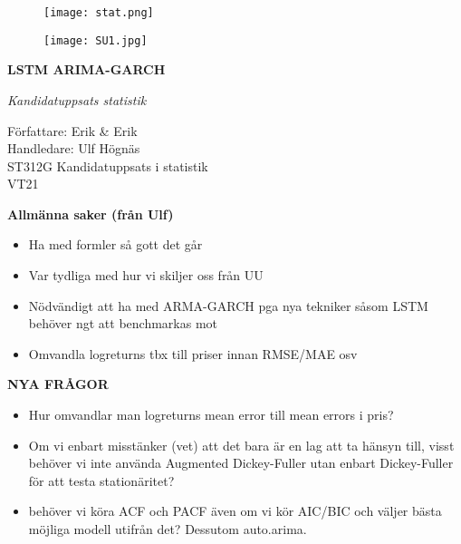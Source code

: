 \documentclass[12pt]{article}
\begin{document}
\begin{titlepage}
\thispagestyle{empty}
	\begin{figure}[ht]
			\texttt{[image: stat.png]}
			
	   \endminipage
		 \texttt{[image: SU1.jpg]}
			
\endminipage
\end{figure}
	
	
\centering
\vspace{5cm}

{\large\bfseries LSTM ARIMA-GARCH\par}
	\vspace{0.5cm}
	
{\large\itshape Kandidatuppsats statistik \par}
	\vfill
	
\begin{flushleft}
Författare: Erik \& Erik \\
Handledare: Ulf Högnäs\\
ST312G Kandidatuppsats i statistik \\
VT21
\end{flushleft}
\end{titlepage}

\newpage
\tableofcontents
\newpage

\textbf{Allmänna saker (från Ulf)}
\begin{itemize}
    \item Ha med formler så gott det går
    \item Var tydliga med hur vi skiljer oss från UU
    \item Nödvändigt att ha med ARMA-GARCH pga nya tekniker såsom LSTM behöver ngt att benchmarkas mot
    \item Omvandla logreturns tbx till priser innan RMSE/MAE osv
\end{itemize}

\textbf{NYA FRÅGOR}
\begin{itemize}
    \item Hur omvandlar man logreturns mean error till mean errors i pris?
    \item Om vi enbart misstänker (vet) att det bara är en lag att ta hänsyn till, visst behöver vi inte använda Augmented Dickey-Fuller utan enbart Dickey-Fuller för att testa stationäritet?
    \item behöver vi köra ACF och PACF även om vi kör AIC/BIC och väljer bästa möjliga modell utifrån det? Dessutom auto.arima.
\end{itemize}
\end{document}
